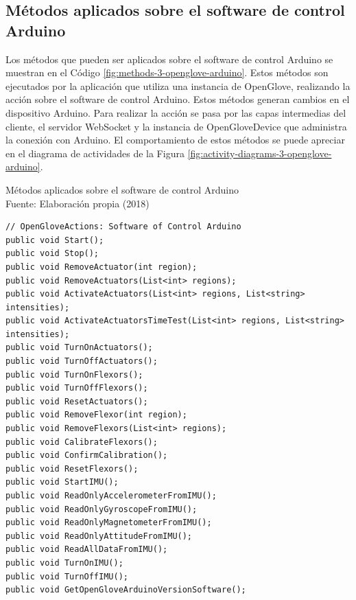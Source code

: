 \subsection{Métodos aplicados sobre el software de control Arduino}
\label{subsection:method-openglove-arduino}
Los métodos que pueden ser aplicados sobre el software de control Arduino se muestran en el Código \ref{fig:methods-3-openglove-arduino}. Estos métodos son ejecutados por la aplicación que utiliza una instancia de OpenGlove, realizando la acción sobre el software de control Arduino. Estos métodos generan cambios en el dispositivo Arduino. Para realizar la acción se pasa por las capas intermedias del cliente, el servidor WebSocket y la instancia de OpenGloveDevice que administra la conexión con Arduino. El comportamiento de estos métodos se puede apreciar en el diagrama de actividades de la Figura \ref{fig:activity-diagrams-3-openglove-arduino}.


\begin{algorithm}[!ht]
  \begin{center} 
   	\captionsetup{justification=centering}
    \caption[Métodos aplicados sobre el software de control Arduino]{Métodos aplicados sobre el software de control Arduino\\ \tab[4cm] Fuente: Elaboración propia (2018)}
    \label{fig:methods-3-openglove-arduino}
  \end{center}
  \begin{lstlisting}
// OpenGloveActions: Software of Control Arduino
public void Start();
public void Stop();
public void RemoveActuator(int region);
public void RemoveActuators(List<int> regions);
public void ActivateActuators(List<int> regions, List<string> intensities);
public void ActivateActuatorsTimeTest(List<int> regions, List<string> intensities);
public void TurnOnActuators();
public void TurnOffActuators();
public void TurnOnFlexors();
public void TurnOffFlexors();
public void ResetActuators();
public void RemoveFlexor(int region);
public void RemoveFlexors(List<int> regions);
public void CalibrateFlexors();
public void ConfirmCalibration();
public void ResetFlexors();
public void StartIMU();
public void ReadOnlyAccelerometerFromIMU();
public void ReadOnlyGyroscopeFromIMU();
public void ReadOnlyMagnetometerFromIMU();
public void ReadOnlyAttitudeFromIMU();
public void ReadAllDataFromIMU();
public void TurnOnIMU();
public void TurnOffIMU();
public void GetOpenGloveArduinoVersionSoftware();
\end{lstlisting}
\end{algorithm}



